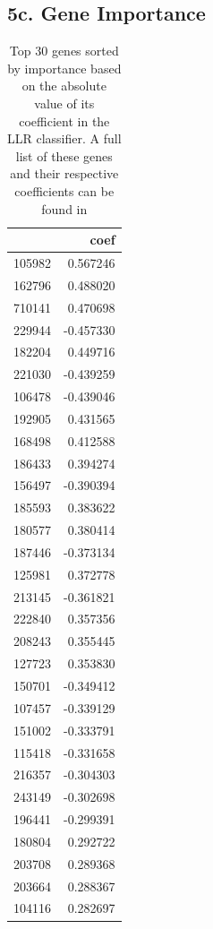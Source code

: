\documentclass[twocolumn]{article}
\begin{document}
\subsection{5c. Gene Importance}
\begin{table}[h!]
    \begin{tabular}{lr}
    \toprule
     & coef \\
    \midrule
    105982 & 0.567246 \\
    162796 & 0.488020 \\
    710141 & 0.470698 \\
    229944 & -0.457330 \\
    182204 & 0.449716 \\
    221030 & -0.439259 \\
    106478 & -0.439046 \\
    192905 & 0.431565 \\
    168498 & 0.412588 \\
    186433 & 0.394274 \\
    156497 & -0.390394 \\
    185593 & 0.383622 \\
    180577 & 0.380414 \\
    187446 & -0.373134 \\
    125981 & 0.372778 \\
    213145 & -0.361821 \\
    222840 & 0.357356 \\
    208243 & 0.355445 \\
    127723 & 0.353830 \\
    150701 & -0.349412 \\
    107457 & -0.339129 \\
    151002 & -0.333791 \\
    115418 & -0.331658 \\
    216357 & -0.304303 \\
    243149 & -0.302698 \\
    196441 & -0.299391 \\
    180804 & 0.292722 \\
    203708 & 0.289368 \\
    203664 & 0.288367 \\
    104116 & 0.282697 \\
    \bottomrule
    \end{tabular}
    \caption{Top 30 genes sorted by importance based on the absolute value of its coefficient in the LLR classifier. A full list of these genes and their respective coefficients can be found in }
    \label{tab:genes-lasso}
\end{table}
\end{document}
